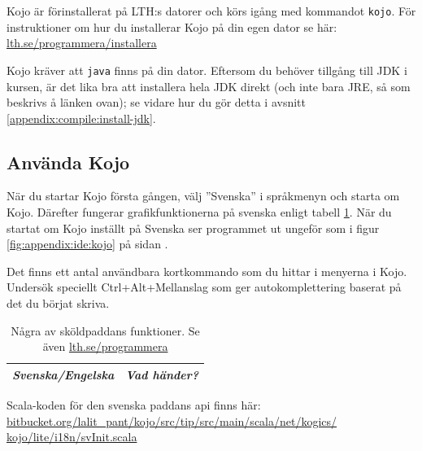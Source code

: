 Kojo är förinstallerat på LTH:s datorer och körs igång med kommandot \texttt{kojo}. För instruktioner om hur du installerar Kojo på din egen dator se här:\\
\href{http://www.lth.se/programmera/installera/}{lth.se/programmera/installera}

Kojo kräver att \texttt{java} finns på din dator. Eftersom du behöver tillgång till JDK i kursen, är det lika bra att installera hela JDK direkt (och inte bara JRE, så som beskrivs å länken ovan); se vidare hur du gör detta i avsnitt \ref{appendix:compile:install-jdk}. 


\subsection{Använda Kojo}

När du startar Kojo första gången, välj ''Svenska'' i språkmenyn och starta om Kojo. Därefter fungerar grafikfunktionerna på svenska enligt tabell \ref{table:kojo:functions}. När du startat om Kojo inställt på Svenska ser programmet ut ungeför som i figur \ref{fig:appendix:ide:kojo} på sidan \pageref{fig:appendix:ide:kojo}.


Det finns ett antal användbara kortkommando som du hittar i menyerna i Kojo. Undersök speciellt Ctrl+Alt+Mellanslag som ger autokomplettering baserat på det du börjat skriva.


{\small\renewcommand{\arraystretch}{1.45}
\begin{longtable}{@{}p{} p{}}

\caption{Några av sköldpaddans funktioner. Se även \href{http://lth.se/programmera}{lth.se/programmera}}\label{table:kojo:functions}\\

\emph{Svenska/Engelska} & \emph{Vad händer?}  \\ \hline


\hline
\end{longtable}
}%

\noindent Scala-koden för den svenska paddans api finns här: \\
\href{https://bitbucket.org/lalit_pant/kojo/src/tip/src/main/scala/net/kogics/kojo/lite/i18n/svInit.scala}{bitbucket.org/lalit\_pant/kojo/src/tip/src/main/scala/net/kogics/\\kojo/lite/i18n/svInit.scala}




